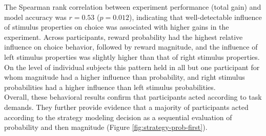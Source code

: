 The Spearman rank correlation between experiment performance (total gain) and model accuracy was $r=0.53$ ($p=0.012$), indicating that well-detectable influence of stimulus properties on choice was associated with higher gains in the experiment.
Across participants, reward probability had the highest relative influence on choice behavior, followed by reward magnitude, and the influence of left stimulus properties was slightly higher than that of right stimulus properties.
On the level of individual subjects this pattern held in all but one participant for whom magnitude had a higher influence than probability, and right stimulus probabilities had a higher influence than left stimulus probabilities.\\
Overall, these behavioral results confirm that participants acted according to task demands.
They further provide evidence that a majority of participants acted according to the strategy modeling decision as a sequential evaluation of probability and then magnitude (Figure \ref{fig:strategy-prob-first}).




